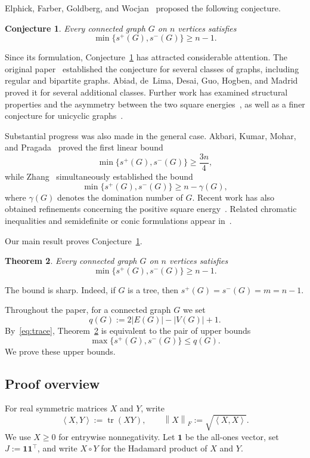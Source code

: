 \documentclass[11pt,letterpaper,reqno]{amsart}
\newtheorem{theorem}{Theorem}[section]
\newtheorem{conjecture}[theorem]{Conjecture}
\theoremstyle{definition}
\newcommand{\tr}{\operatorname{tr}}
\newcommand{\ip}[2]{\left\langle #1,#2\right\rangle}
\newcommand{\norm}[1]{\left\lVert #1\right\rVert}
\newcommand{\ones}{\mathbf 1}
\begin{document}
Elphick, Farber, Goldberg, and Wocjan~\cite[Conjecture~1]{EFGW} proposed the following conjecture.

\begin{conjecture}\label{conj:EFGW}
Every connected graph $G$ on $n$ vertices satisfies
\[
\min\{s^+(G),s^-(G)\}\ge n-1.
\]
\end{conjecture}

Since its formulation, Conjecture~\ref{conj:EFGW} has attracted
considerable attention. The original paper~\cite{EFGW} established the conjecture for several
classes of graphs, including regular and bipartite graphs.  Abiad,
de~Lima, Desai, Guo, Hogben, and Madrid~\cite{AbiadEtAl} proved it for several additional classes.  Further work has
examined structural properties and the asymmetry between the two square
energies~\cite{EL}, as well as a finer conjecture for unicyclic graphs~\cite{NZ}. 


Substantial progress was also made in the general case. Akbari, Kumar,
Mohar, and Pragada~\cite{AKMP} proved the first linear bound
\[
    \min\{s^+(G),s^-(G)\}\ge \frac{3n}{4},
\]
while Zhang~\cite{Zh} simultaneously established the bound
\[
    \min\{s^+(G),s^-(G)\}\ge n-\gamma(G),
\]
where $\gamma(G)$ denotes the domination number of $G$. Recent work has
also obtained refinements concerning the positive square
energy~\cite{AKMPZ}. Related chromatic inequalities and semidefinite or
conic formulations appear in~\cite{AL,CS,CSZ,WE}.

Our main result proves Conjecture~\ref{conj:EFGW}.

\begin{theorem}\label{thm:main}
Every connected graph $G$ on $n$ vertices satisfies
\[
    \min\{s^+(G),s^-(G)\}\ge n-1.
\]
\end{theorem}

The bound is sharp.  Indeed, if $G$ is a tree, then $s^+(G)=s^-(G)=m=n-1$.

Throughout the paper, for a connected graph $G$ we set
\[
    q(G):=2|E(G)|-|V(G)|+1.
\]
By~\eqref{eq:trace}, Theorem~\ref{thm:main} is equivalent to the pair of
upper bounds
\[
      \max\{s^+(G),s^-(G)\}\leq q(G).
\]
We prove these upper bounds.




\subsection{Proof overview}
For real symmetric matrices $X$ and $Y$, write
\[
    \ip XY:=\tr(XY),
    \qquad
    \norm X_F:=\sqrt{\ip XX}.
\]
We use $X\ge0$ for entrywise nonnegativity.  Let $\ones$ be the all-ones
vector, set $J:=\ones\ones^{\top}$, and write $X\circ Y$ for the Hadamard
product of $X$ and $Y$.
\end{document}
